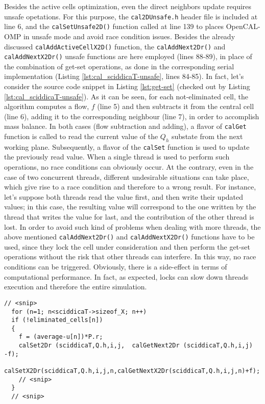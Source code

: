 Besides the active cells optimization, even the direct neighbors
update requires unsafe opetations. For this purpose, the
\verb'cal2DUnsafe.h' header file is included at line 6, and the
\verb'calSetUnsafe2D()' function called at line 139 to places
OpenCAL-OMP in unsafe mode and avoid race condition issues. Besides
the already discussed \verb'calAddActiveCellX2D()' function, the
\verb'calAddNext2Dr()' and \verb'calAddNextX2Dr()' unsafe functions
are here employed (lines 88-89), in place of the combination of
get-set operations, as done in the corresponding serial implementation
(Listing \ref{lst:cal_sciddicaT-unsafe}, lines 84-85). In fact, let's
consider the source code snippet in Listing \ref{lst:get-set} (checked
out by Listing \ref{lst:cal_sciddicaT-unsafe}). As it can be seen, for
each not-eliminated cell, the algorithm computes a flow, $f$ (line 5)
and then subtracts it from the central cell (line 6), adding it to the
corresponding neighbour (line 7), in order to accomplish mass
balance. In both cases (flow subtraction and adding), a flavor of
\verb'calGet' function is called to read the current value of the
$Q_h$ substate from the next working plane. Subsequently, a flavor of
the \verb'calSet' function is used to update the previously read
value. When a single thread is used to perform such operations, no
race conditions can obviously occur. At the contrary, even in the case
of two concurrent threads, different undesirable situations can take
place, which give rise to a race condition and therefore to a wrong
result. For instance, let's suppose both threads read the value first,
and then write their updated values; in this case, the resulting value
will correspond to the one written by the thread that writes the value
for last, and the contribution of the other thread is lost. In order
to avoid such kind of problems when dealing with more threads, the
above mentioned \verb'calAddNext2Dr()' and \verb'calAddNextX2Dr()'
functions have to be used, since they lock the cell under
consideration and then perform the get-set operations without the risk
that other threads can interfere. In this way, no race conditions can
be triggered. Obviously, there is a side-effect in terms of
computational performance. In fact, as expected, locks can slow down
threads execution and therefore the entire simulation.

\begin{lstlisting}[float,floatplacement=H, label=lst:get-set, caption=Example of non atomic operation made of a combination of get-set calls.]
  // <snip>
  for (n=1; n<sciddicaT->sizeof_X; n++)
  if (!eliminated_cells[n])
  {
    f = (average-u[n])*P.r;
    calSet2Dr (sciddicaT,Q.h,i,j,  calGetNext2Dr (sciddicaT,Q.h,i,j)  -f);
    calSetX2Dr(sciddicaT,Q.h,i,j,n,calGetNextX2Dr(sciddicaT,Q.h,i,j,n)+f);
    // <snip>
  }
  // <snip>
\end{lstlisting}


